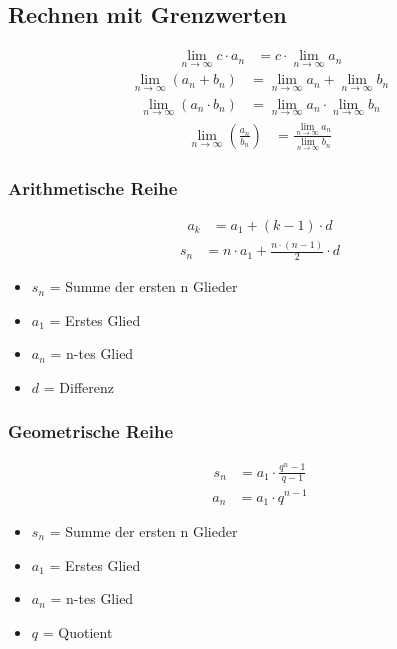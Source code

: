 \subsection{Rechnen mit Grenzwerten}
\begin{align*}
	\lim_{n \to \infty} c \cdot a_n & = c \cdot \lim_{n \to \infty} a_n
\end{align*}
\begin{align*}
	\lim_{n \to \infty} (a_n + b_n) & = \lim_{n \to \infty} a_n + \lim_{n \to \infty} b_n
\end{align*}
\begin{align*}
	\lim_{n \to \infty} (a_n \cdot b_n) & = \lim_{n \to \infty} a_n \cdot \lim_{n \to \infty} b_n
\end{align*}
\begin{align*}
	\lim_{n \to \infty}(\frac{a_n}{b_n}) & = \frac{\lim_{n \to \infty} a_n}{\lim_{n \to \infty} b_n}
\end{align*}
\subsubsection{Arithmetische Reihe}
\begin{align*}
	a_k & = a_1 + (k-1) \cdot d
\end{align*}
\begin{align*}
    s_n & =n \cdot a_1 + \frac{n \cdot (n-1)}{2} \cdot d
\end{align*}
\begin{itemize}
	\item $s_n$ = Summe der ersten n Glieder
	\item $a_1$ = Erstes Glied
	\item $a_n$ = n-tes Glied
	\item $d$ = Differenz
\end{itemize}
\subsubsection{Geometrische Reihe}
\begin{align*}
    s_n & = a_1 \cdot \frac{q^n-1}{q-1}
\end{align*}
\begin{align*}
	a_n & = a_1 \cdot q^{n-1}
\end{align*}
\begin{itemize}
	\item $s_n$ = Summe der ersten n Glieder
	\item $a_1$ = Erstes Glied
	\item $a_n$ = n-tes Glied
	\item $q$ = Quotient
\end{itemize}
